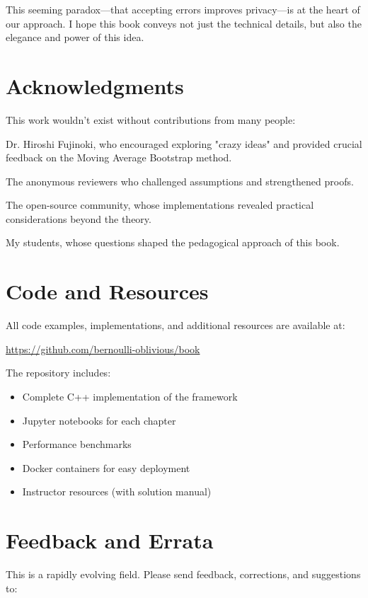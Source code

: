 This seeming paradox—that accepting errors improves privacy—is at the heart of our approach. I hope this book conveys not just the technical details, but also the elegance and power of this idea.

\section*{Acknowledgments}

This work wouldn't exist without contributions from many people:

Dr. Hiroshi Fujinoki, who encouraged exploring "crazy ideas" and provided crucial feedback on the Moving Average Bootstrap method.

The anonymous reviewers who challenged assumptions and strengthened proofs.

The open-source community, whose implementations revealed practical considerations beyond the theory.

My students, whose questions shaped the pedagogical approach of this book.

\section*{Code and Resources}

All code examples, implementations, and additional resources are available at:

\begin{center}
\url{https://github.com/bernoulli-oblivious/book}
\end{center}

The repository includes:
\begin{itemize}
    \item Complete C++ implementation of the framework
    \item Jupyter notebooks for each chapter
    \item Performance benchmarks
    \item Docker containers for easy deployment
    \item Instructor resources (with solution manual)
\end{itemize}

\section*{Feedback and Errata}

This is a rapidly evolving field. Please send feedback, corrections, and suggestions to:


